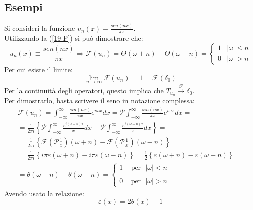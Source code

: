\documentclass[twoside]{article}
\begin{document}
\subsection{Esempi}
Si consideri la funzione $u_n(x)\equiv\frac{sen(nx)}{\pi x}$.\\
Utilizzando la (\ref{19 P}) si può dimostrare che:
\begin{equation}
    u_n(x)\equiv\frac{sen(nx)}{\pi x} \Longrightarrow \mathcal{F}(u_n)=\Theta(\omega+n)-\Theta(\omega-n)=\begin{cases}
    1 & |\omega|\le n\\
    0 & |\omega|>n
    \end{cases}
\end{equation}
Per cui esiste il limite:
\begin{equation}
    \lim_{n\to\infty}\mathcal{F}(u_n)=1=\mathcal{F}(\delta_0)
\end{equation}
Per la continuità degli operatori, questo implica che $T_{u_n}\xrightarrow{S'}\delta_0$.\\
Per dimostrarlo, basta scrivere il seno in notazione complessa:
\begin{equation}\begin{split}
    \mathcal{F}(u_n)=\int_{-\infty}^\infty \frac{sin(nx)}{\pi x}e^{i\omega x}dx=\mathscr{P}\int_{-\infty}^\infty \frac{sin(nx)}{\pi x}e^{i\omega x}dx=\\
    =\frac{1}{2\pi i}\left\{ \mathscr{P}\int_{-\infty}^\infty \frac{e^{i(\omega+n)x}}{x}dx-\mathscr{P}\int_{-\infty}^\infty \frac{e^{i(\omega-n)x}}{x}dx  \right\}=\\
    =\frac{1}{2\pi i}\left\{ \mathcal{F}\left(\mathscr{P}\frac{1}{x} \right)(\omega +n)-\mathcal{F}\left(\mathscr{P}\frac{1}{x} \right)(\omega -n) \right\}=\\
    =\frac{1}{2\pi i}\left\{ i\pi \varepsilon(\omega +n)-i \pi \varepsilon(\omega-n) \right\}=\frac{1}{2}\left\{ \varepsilon(\omega+n)-\varepsilon(\omega-n) \right\}=\\
    =\theta(\omega+n)-\theta(\omega-n)=\left\{ \begin{array}{cc}
         1 \ \ \ \ \ \text{per} \ \ \ |\omega|<n  \\
         &  \\
         0 \ \ \ \ \ \text{per} \ \ \ |\omega|>n
    \end{array}\right.
\end{split}\end{equation}
Avendo usato la relazione:
\begin{equation}
    \varepsilon(x)=2\theta(x)-1
\end{equation}
\end{document}
